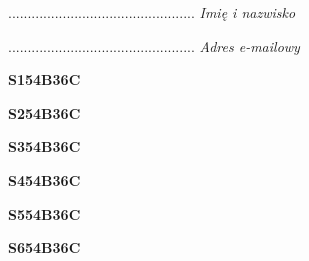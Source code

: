 \begin{turn}{90}\begin{minipage}{\linewidth} \vspace{20mm} ................................................  \textit{Imię i nazwisko}\end{minipage}\end{turn}

\begin{turn}{90}\begin{minipage}{\linewidth} \vspace{20mm} ................................................  \textit{Adres e-mailowy}\end{minipage}\end{turn}

\begin{turn}{90}\huge \begin{minipage}{\linewidth} \vspace{10mm}\textbf{S154B36C}\end{minipage}\end{turn}

\begin{turn}{90}\huge \begin{minipage}{\linewidth} \vspace{10mm}\textbf{S254B36C}\end{minipage}\end{turn}

\begin{turn}{90}\huge \begin{minipage}{\linewidth} \vspace{10mm}\textbf{S354B36C}\end{minipage}\end{turn}

\begin{turn}{90}\huge \begin{minipage}{\linewidth} \vspace{10mm}\textbf{S454B36C}\end{minipage}\end{turn}

\begin{turn}{90}\huge \begin{minipage}{\linewidth} \vspace{10mm}\textbf{S554B36C}\end{minipage}\end{turn}

\begin{turn}{90}\huge \begin{minipage}{\linewidth} \vspace{10mm}\textbf{S654B36C}\end{minipage}\end{turn}

